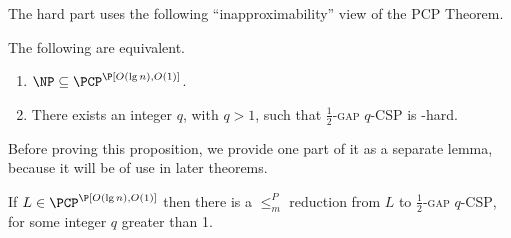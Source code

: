 \documentclass{article}
\begin{document}
The hard part uses the following ``inapproximability'' view of the PCP Theorem.
\begin{proposition}\label{prop:equivalence}
  The following are equivalent.
  \begin{enumerate}
  \item $\NP \subseteq \PCP^\P[O(\lg n), O(1)]$.
  \item There exists an integer $q$, with $q > 1$, such that \textsc{$\frac{1}{2}$-gap $q$-CSP} is \NP-hard.
  \end{enumerate}
\end{proposition}

Before proving this proposition, we provide one part of it as a separate lemma, because it will be of use in later theorems.

\begin{lemma}\label{lem:constraintsp}
  If $L \in \PCP^\P[O(\lg n), O(1)]$ then there is a $\leq_m^P$ reduction from $L$ to \textsc{$\frac{1}{2}$-gap $q$-CSP}, for some integer $q$ greater than 1.
\end{lemma}
\end{document}
